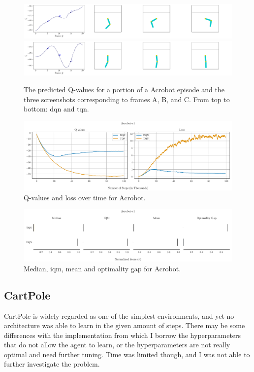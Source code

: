 \begin{figure}[!htbp]
\centering
\includegraphics[width=\textwidth]{images/q-vs-frame_DQN_Acrobot-v1.pdf}
\includegraphics[width=\textwidth]{images/q-vs-frame_TQN_Acrobot-v1.pdf}
\caption{The predicted Q-values for a portion of a Acrobot episode and the three screenshots corresponding to frames A, B, and C. From top to bottom: \acrshort{dqn} and \acrshort{tqn}.}
\label{fig:q-vs-frame-DQN-Acrobot-v1}
\end{figure}

\begin{figure}[!htbp]
\centering
\includegraphics[width=\textwidth]{images/q-vs-loss_DQN-TQN_Acrobot-v1.pdf}
\caption{Q-values and loss over time for Acrobot.}
\label{fig:q-vs-loss-Acrobot=v1}
\end{figure}

\begin{figure}[!htbp]
\centering
\includegraphics[width=\textwidth]{images/statistics_DQN-TQN_Acrobot-v1.pdf}
\caption{Median, \acrshort{iqm}, mean and optimality gap for Acrobot.}
\label{fig:statistics-Acrobot-v1}
\end{figure}

\subsection*{CartPole}
CartPole is widely regarded as one of the simplest environments, and yet no architecture was able to learn in the given amount of steps. There may be some differences with the implementation from which I borrow the hyperparameters \cite{rl_zoo3} that do not allow the agent to learn, or the hyperparameters are not really optimal and need further tuning. Time was limited though, and I was not able to further investigate the problem.

